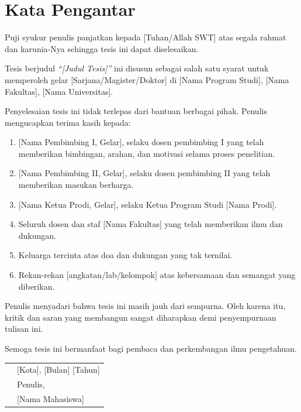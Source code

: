 
\chapter*{Kata Pengantar}

Puji syukur penulis panjatkan kepada [Tuhan/Allah SWT] atas segala rahmat dan karunia-Nya
sehingga tesis ini dapat diselesaikan.

Tesis berjudul \textit{``[Judul Tesis]''} ini disusun sebagai salah satu syarat untuk
memperoleh gelar [Sarjana/Magister/Doktor] di [Nama Program Studi], [Nama Fakultas],
[Nama Universitas].

Penyelesaian tesis ini tidak terlepas dari bantuan berbagai pihak. Penulis mengucapkan
terima kasih kepada:

\begin{enumerate}
  \item {[Nama Pembimbing I, Gelar]}, selaku dosen pembimbing I yang telah memberikan
        bimbingan, arahan, dan motivasi selama proses penelitian.
  \item {[Nama Pembimbing II, Gelar]}, selaku dosen pembimbing II yang telah memberikan
        masukan berharga.
  \item {[Nama Ketua Prodi, Gelar]}, selaku Ketua Program Studi [Nama Prodi].
  \item Seluruh dosen dan staf [Nama Fakultas] yang telah memberikan ilmu dan dukungan.
  \item Keluarga tercinta atas doa dan dukungan yang tak ternilai.
  \item Rekan-rekan [angkatan/lab/kelompok] atas kebersamaan dan semangat yang diberikan.
\end{enumerate}

Penulis menyadari bahwa tesis ini masih jauh dari sempurna. Oleh karena itu, kritik dan
saran yang membangun sangat diharapkan demi penyempurnaan tulisan ini.

Semoga tesis ini bermanfaat bagi pembaca dan perkembangan ilmu pengetahuan.

\vspace{1cm}

\noindent
\begin{tabular}{p{8cm}p{5cm}}
 & [Kota], [Bulan] [Tahun] \\[0.2cm]
 & Penulis, \\[2.5cm]
 & [Nama Mahasiswa] \\
\end{tabular}

\clearpage
